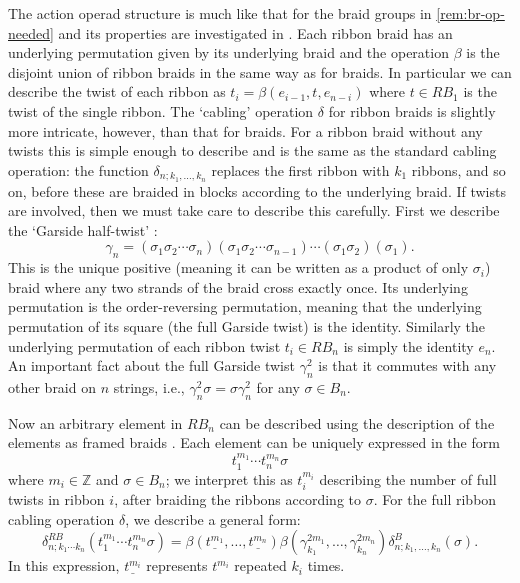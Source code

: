 \begin{example}
The action operad structure is much like that for the braid groups in \cref{rem:br-op-needed} and its properties are investigated in \cite{wahl-thesis}. Each ribbon braid has an underlying permutation given by its underlying braid and the operation $\beta$ is the disjoint union of ribbon braids in the same way as for braids. In particular we can describe the twist of each ribbon as $t_i = \beta(e_{i-1},t,e_{n-i})$ where $t \in RB_1$ is the twist of the single ribbon. The `cabling' operation $\delta$ for ribbon braids is slightly more intricate, however, than that for braids. For a ribbon braid without any twists this is simple enough to describe and is the same as the standard cabling operation: the function $\delta_{n;k_1,\ldots,k_n}$ replaces the first ribbon with $k_1$ ribbons, and so on, before these are braided in blocks according to the underlying braid. If twists are involved, then we must take care to describe this carefully. First we describe the `Garside half-twist' \cite[Section 2]{garside}:
    \[
        \gamma_n = (\sigma_1 \sigma_2 \cdots \sigma_n)(\sigma_1 \sigma_2 \cdots \sigma_{n-1})\cdots(\sigma_1 \sigma_2)(\sigma_1).
    \]
This is the unique positive (meaning it can be written as a product of only $\sigma_i$) braid where any two strands of the braid cross exactly once. Its underlying permutation is the order-reversing permutation, meaning that the underlying permutation of its square (the full Garside twist) is the identity. Similarly the underlying permutation of each ribbon twist $t_i \in RB_n$ is simply the identity $e_n$. An important fact about the full Garside twist $\gamma_n^2$ is that it commutes with any other braid on $n$ strings, i.e., $\gamma_n^2 \sigma = \sigma \gamma_n^2$ for any $\sigma \in B_n$.

Now an arbitrary element in $RB_n$ can be described using the description of the elements as framed braids \cite{KS-framed}. Each element can be uniquely expressed in the form
    \[
        t_1^{m_1}\cdots t_n^{m_n}\sigma
    \]
where $m_i \in \mathbb{Z}$ and $\sigma \in B_n$; we interpret this as $t_i^{m_i}$ describing the number of full twists in ribbon $i$, after braiding the ribbons according to $\sigma$. For the full ribbon cabling operation $\delta$, we describe a general form:
    \[
        \delta^{RB}_{n;k_1\cdots k_n}(t_1^{m_1} \cdots t_n^{m_n}\sigma) = \beta(\underline{t^{m_1}},\ldots,\underline{t^{m_n}})\beta(\gamma_{k_1}^{2m_1},\ldots,\gamma_{k_n}^{2m_n})\delta^B_{n;k_1,\ldots,k_n}(\sigma).
    \]
In this expression, $\underline{t^{m_i}}$ represents $t^{m_i}$ repeated $k_i$ times.


\end{example}
